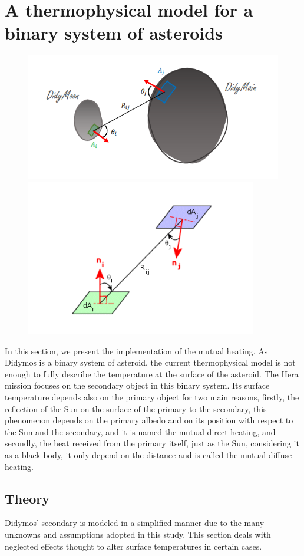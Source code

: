 \section{A thermophysical model for a binary system of asteroids}
\label{sec:4}

\begin{figure}[t]
    \centering
    \includegraphics[width=0.35\linewidth]{rsc/viewfac1.png} 
    \includegraphics[width=0.35\linewidth]{rsc/viewfac2.png}
    \label{fig:4.1}
\end{figure}

In this section, we present the implementation of the mutual heating. As Didymos is a binary system of asteroid, the current thermophysical model is not enough to fully describe the temperature at the surface of the asteroid. The Hera mission focuses on the secondary object in this binary system. Its surface temperature depends also on the primary object for two main reasons, firstly, the reflection of the Sun on the surface of the primary to the secondary, this phenomenon depends on the primary albedo and on its position with respect to the Sun and the secondary, and it is named the mutual direct heating, and secondly, the heat received from the primary itself, just as the Sun, considering it as a black body, it only depend on the distance and is called the mutual diffuse heating.

\subsection{Theory}

Didymos’ secondary is modeled in a simplified manner due to the many unknowns and assumptions adopted in this study. This section deals with neglected effects thought to alter surface temperatures in certain cases.

